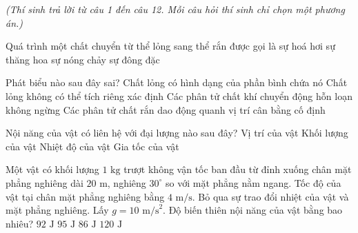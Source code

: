 \vspace{0.15cm}
\begin{flushleft}
	{\color{blue!50!green}}
	\textit{\small (Thí sinh trả lời từ câu 1 đến câu 12. Mỗi câu hỏi thí sinh chỉ chọn một phương án.)}
\end{flushleft}
\setcounter{ex}{0}
\setcounter{bt}{0}

\begin{ex}
	Quá trình một chất chuyển từ thể lỏng sang thể rắn được gọi là
	\choice
	{sự hoá hơi}
	{sự thăng hoa}
	{sự nóng chảy}
	{\True sự đông đặc}
\end{ex}

\begin{ex}
	Phát biểu nào sau đây sai?
	\choice
	{Chất lỏng có hình dạng của phần bình chứa nó}
	{\True Chất lỏng không có thể tích riêng xác định}
	{Các phân tử chất khí chuyển động hỗn loạn không ngừng}
	{Các phân tử chất rắn dao động quanh vị trí cân bằng cố định}
\end{ex}

\begin{ex}
	Nội năng của vật có liên hệ với đại lượng nào sau đây?
	\choice
	{Vị trí của vật}
	{Khối lượng của vật}
	{\True Nhiệt độ của vật}
	{Gia tốc của vật}
\end{ex}

\begin{ex}
	Một vật có khối lượng $1\text{ kg}$ trượt không vận tốc ban đầu từ đỉnh xuống chân mặt phẳng nghiêng dài $20\text{ m}$, nghiêng $30^\circ$ so với mặt phẳng nằm ngang. Tốc độ của vật tại chân mặt phẳng nghiêng bằng $4\text{ m/s}$. Bỏ qua sự trao đổi nhiệt của vật và mặt phẳng nghiêng. Lấy $g = 10\text{ m/s}^2$. Độ biến thiên nội năng của vật bằng bao nhiêu?
	\choice
	{\True $92\text{ J}$}
	{$95\text{ J}$}
	{$86\text{ J}$}
	{$120\text{ J}$}
\end{ex}


